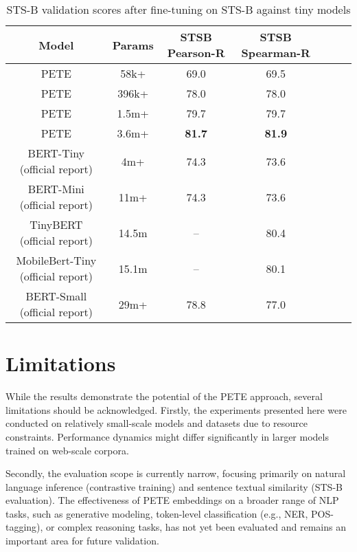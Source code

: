 \documentclass{article}
\begin{document}
\begin{table}[h!]
    \centering
    \begin{adjustbox}{max width=\textwidth}
    \begin{tabular}{|c|c|c|c|c|c|c|}
        \hline
        \textbf{Model} & \textbf{Params} & \textbf{STSB Pearson-R} & \textbf{STSB Spearman-R}\\
        \hline
        PETE & 58k+ & 69.0 & 69.5\\
        \hline
        PETE & 396k+ & 78.0 & 78.0\\
        \hline
        PETE & 1.5m+ & 79.7 & 79.7\\
        \hline
        PETE & 3.6m+ & \textbf{81.7} & \textbf{81.9}\\
        \hline
        BERT-Tiny (official report) & 4m+ & 74.3 & 73.6\\
        \hline
        BERT-Mini (official report) & 11m+ & 74.3 & 73.6\\
        \hline
        TinyBERT (official report) & 14.5m & -- & 80.4\\
        \hline 
        MobileBert-Tiny (official report) & 15.1m  &  -- & 80.1\\
        \hline
        BERT-Small (official report) & 29m+ & 78.8 & 77.0\\
        \hline
    \end{tabular}
    \end{adjustbox}
    \caption{STS-B validation scores after fine-tuning on STS-B against tiny models}
    \label{tab:model_comparisons}
\end{table}
\section{Limitations}
While the results demonstrate the potential of the PETE approach, several limitations should be acknowledged. Firstly, the experiments presented here were conducted on relatively small-scale models and datasets due to resource constraints. Performance dynamics might differ significantly in larger models trained on web-scale corpora.

Secondly, the evaluation scope is currently narrow, focusing primarily on natural language inference (contrastive training) and sentence textual similarity (STS-B evaluation). The effectiveness of PETE embeddings on a broader range of NLP tasks, such as generative modeling, token-level classification (e.g., NER, POS-tagging), or complex reasoning tasks, has not yet been evaluated and remains an important area for future validation.
\end{document}
